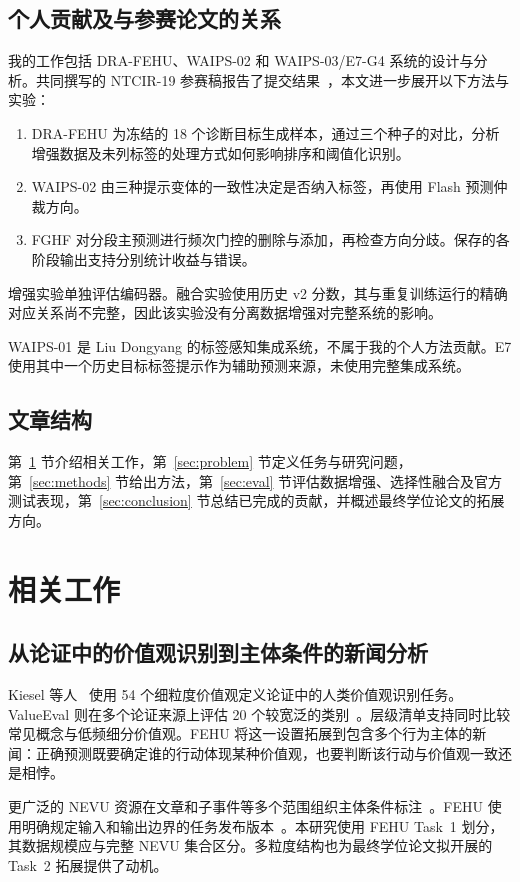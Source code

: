 \documentclass[12pt,a4paper]{article}
\begin{document}
\subsection{个人贡献及与参赛论文的关系}
我的工作包括 DRA-FEHU、WAIPS-02 和 WAIPS-03/E7-G4 系统的设计与分析。共同撰写的 NTCIR-19 参赛稿报告了提交结果~\cite{waipspaper}，本文进一步展开以下方法与实验：
\begin{enumerate}
\item DRA-FEHU 为冻结的 18 个诊断目标生成样本，通过三个种子的对比，分析增强数据及未列标签的处理方式如何影响排序和阈值化识别。
\item WAIPS-02 由三种提示变体的一致性决定是否纳入标签，再使用 Flash 预测仲裁方向。
\item FGHF 对分段主预测进行频次门控的删除与添加，再检查方向分歧。保存的各阶段输出支持分别统计收益与错误。
\end{enumerate}
增强实验单独评估编码器。融合实验使用历史 v2 分数，其与重复训练运行的精确对应关系尚不完整，因此该实验没有分离数据增强对完整系统的影响。

WAIPS-01 是 Liu Dongyang 的标签感知集成系统，不属于我的个人方法贡献。E7 使用其中一个历史目标标签提示作为辅助预测来源，未使用完整集成系统。

\subsection{文章结构}
第~\ref{sec:related} 节介绍相关工作，第~\ref{sec:problem} 节定义任务与研究问题，第~\ref{sec:methods} 节给出方法，第~\ref{sec:eval} 节评估数据增强、选择性融合及官方测试表现，第~\ref{sec:conclusion} 节总结已完成的贡献，并概述最终学位论文的拓展方向。

\sectionbreak
\section{相关工作}\label{sec:related}
\subsection{从论证中的价值观识别到主体条件的新闻分析}
Kiesel 等人~\cite{kiesel2022} 使用 54 个细粒度价值观定义论证中的人类价值观识别任务。ValueEval 则在多个论证来源上评估 20 个较宽泛的类别~\cite{valueeval}。层级清单支持同时比较常见概念与低频细分价值观。FEHU 将这一设置拓展到包含多个行为主体的新闻：正确预测既要确定谁的行动体现某种价值观，也要判断该行动与价值观一致还是相悖。

更广泛的 NEVU 资源在文章和子事件等多个范围组织主体条件标注~\cite{nevu}。FEHU 使用明确规定输入和输出边界的任务发布版本~\cite{fehuoverview}。本研究使用 FEHU Task~1 划分，其数据规模应与完整 NEVU 集合区分。多粒度结构也为最终学位论文拟开展的 Task~2 拓展提供了动机。
\end{document}
